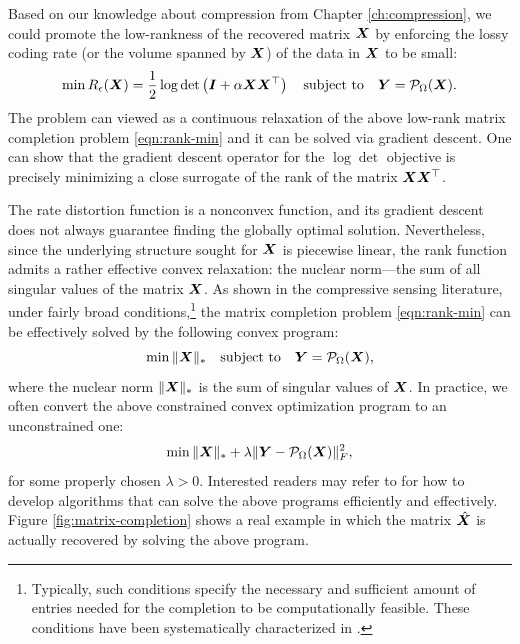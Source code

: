 \documentclass[../../book-main.tex]{subfiles}
\begin{document}
Based on our knowledge about compression from Chapter
\ref{ch:compression}, we could  promote the low-rankness of the
recovered matrix $\bm{X}$ by enforcing the lossy coding rate (or the
volume spanned by $\bm{X}$) of the data in $\bm{X}$ to be small:
\begin{equation}
\min R_\epsilon(\bm{X}) = \frac{1}{2} \log \det \left(\boldsymbol{I} +
\alpha  \bm{X}\bm{X}^\top \right) \quad \mbox{subject to}
\quad
\bm{Y} = \mathcal{P}_{\Omega}(\bm{X}).
\label{eqn:rate-min}
\end{equation}
The problem can viewed as a continuous relaxation of the above
low-rank matrix completion problem \eqref{eqn:rank-min} and it can be
solved via gradient descent. One can show that the gradient descent
operator for the $\log\det$ objective is precisely minimizing a close
surrogate of the rank of the matrix $\bm{X}\bm{X}^\top$.

The rate distortion function is a nonconvex function, and its gradient
descent does not always guarantee finding the globally optimal solution. Nevertheless, since the underlying structure sought for $\bm{X}$ is piecewise linear, the rank function admits a rather effective convex relaxation: the
nuclear norm---the sum of all singular values of the matrix $\bm{X}$. As
shown in the compressive sensing literature, under fairly
broad conditions,\footnote{Typically, such conditions specify the
necessary and sufficient amount of entries needed for the completion
to be computationally feasible. These conditions have been
systematically characterized in \cite{Wright-Ma-2022}.} the matrix
completion problem \eqref{eqn:rank-min}
can be effectively solved by the following convex program:
\begin{equation}
\min \|\bm{X}\|_* \quad \mbox{subject to}
\quad
\bm{Y} = \mathcal{P}_{\Omega}(\bm{X}),
\label{eqn:nuclear-min}
\end{equation}
where the nuclear norm $\|\bm{X}\|_*$ is the sum of singular values of
$\bm{X}$. In practice, we often convert the above constrained convex optimization
program to an unconstrained one:
\begin{equation}
\min \|\bm{X}\|_*  + \lambda \|
\bm{Y} - \mathcal{P}_{\Omega}(\bm{X})\|_F^2,
\label{eqn:nuclear-min-lagrangian}
\end{equation}
for some properly chosen $\lambda > 0$. Interested readers may refer to
\cite{Wright-Ma-2022} for how to develop algorithms  that can solve
the above programs  efficiently and effectively.
Figure \ref{fig:matrix-completion} shows a real example in which the
matrix $\hat {\bm{X}}$ is actually recovered by solving the above program.
\end{document}
